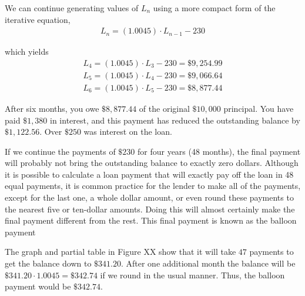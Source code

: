 \documentclass[10pt,]{book}
\theoremstyle{plain}
\theoremstyle{definition}
\theoremstyle{definition}
\theoremstyle{definition}
\numberwithin{equation}{section}
\begin{document}
\par
We can continue generating values of \(L_n\) using a more compact form of the iterative equation,%
%
\begin{gather*}
L_n=(1.0045)\cdot L_{n-1}-230
\end{gather*}
\par
which yields%
%
\begin{gather*}
L_4=(1.0045)\cdot L_3-230=\$9,254.99\\
L_5=(1.0045)\cdot L_4-230=\$9,066.64\\
L_6=(1.0045)\cdot L_5-230=\$8,877.44
\end{gather*}
\par
After six months, you owe \(\$8,877.44\) of the original \(\$10,000\) principal.  You have paid \(\$1,380\) in interest, and this payment has reduced the outstanding balance by \(\$1,122.56\).  Over \(\$250\) was interest on the loan.%
\par
If we continue the payments of \(\$230\) for four years (48 months), the final payment will probably not bring the outstanding balance to exactly zero dollars.  Although it is possible to calculate a loan payment that will exactly pay off the loan in 48 equal payments, it is common practice for the lender to make all of the payments, except for the last one, a whole dollar amount, or even round these payments to the nearest five or ten-dollar amounts. Doing this will almost certainly make the final payment different from the rest.  This final payment is known as the balloon payment%
\par
The graph and partial table in Figure XX show that it will take \(47\) payments to get the balance down to \(\$341.20\).  After one additional month the balance will be \(\$341.20\cdot 1.0045=\$342.74\) if we round in the usual manner.  Thus, the balloon payment would be \(\$342.74\).%
\end{document}

